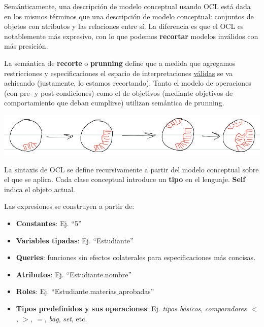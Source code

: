 \documentclass[]{article}
\begin{document}
Semánticamente, una descripción de modelo conceptual usando OCL está dada en los mismos términos que una descripción de modelo conceptual: conjuntos de objetos con atributos y las relaciones entre sí. La diferencia es que el OCL es notablemente más expresivo, con lo que podemos \textbf{recortar} modelos inválidos con más presición.

La semántica de \textbf{recorte} o \textbf{prunning} define que a medida que agregamos restricciones y especificaciones el espacio de interpretaciones \underline{válidas} se va achicando (justamente, lo estamos recortando). Tanto el modelo de operaciones (con pre- y post-condiciones) como el de objetivos (mediante objetivos de comportamiento que deban cumplirse) utilizan semántica de prunning.

\begin{center}
	\includegraphics[scale=0.5]{Prunning.png}
\end{center}

La sintaxis de OCL se define recursivamente a partir del modelo conceptual sobre el que se aplica. Cada clase conceptual introduce un \textbf{tipo} en el lenguaje. \textbf{Self} indica el objeto actual.

Las expresiones se construyen a partir de:
\begin{itemize}
	\item \textbf{Constantes}: Ej. ``5''
	\item \textbf{Variables tipadas}: Ej. ``Estudiante''
	\item \textbf{Queries}: funciones sin efectos colaterales para especificaciones más concisas.
	\item \textbf{Atributos}: Ej. ``Estudiante.nombre''
	\item \textbf{Roles}: Ej. ``Estudiante.materias$\_$aprobadas''
	\item \textbf{Tipos predefinidos y sus operaciones}: Ej. \textit{tipos básicos}, \textit{comparadores $<$, $>$, $=$}, \textit{bag}, \textit{set}, etc.
\end{itemize}

~\newline
\end{document}
